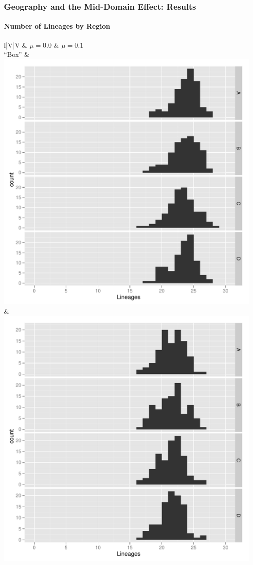 \documentclass[11pt,t]{beamer}
\begin{document}
\begin{frame}
	\frametitle{Geography and the Mid-Domain Effect: Results}
	\framesubtitle{Number of Lineages by Region}
\begin{center}
\begin{tabular}{l|V|V}
			& $\mu=0.0$ & $\mu=0.1$ \\
\hline			
``Box''		& \includegraphics[scale=0.15]{results-lineages-box-d0.pdf}		  &  \includegraphics[scale=0.15]{results-lineages-box-d1.pdf}  	\\

\end{tabular}
\end{center}
\end{frame}
\end{document}
